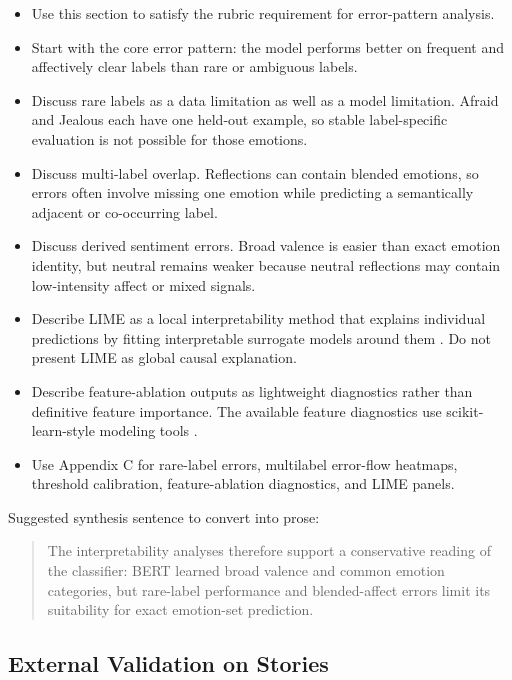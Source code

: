 \begin{itemize}
    \item Use this section to satisfy the rubric requirement for error-pattern analysis.
    \item Start with the core error pattern: the model performs better on frequent and affectively clear labels than rare or ambiguous labels.
    \item Discuss rare labels as a data limitation as well as a model limitation. Afraid and Jealous each have one held-out example, so stable label-specific evaluation is not possible for those emotions.
    \item Discuss multi-label overlap. Reflections can contain blended emotions, so errors often involve missing one emotion while predicting a semantically adjacent or co-occurring label.
    \item Discuss derived sentiment errors. Broad valence is easier than exact emotion identity, but neutral remains weaker because neutral reflections may contain low-intensity affect or mixed signals.
    \item Describe LIME as a local interpretability method that explains individual predictions by fitting interpretable surrogate models around them \parencite{ribeiro2016why}. Do not present LIME as global causal explanation.
    \item Describe feature-ablation outputs as lightweight diagnostics rather than definitive feature importance. The available feature diagnostics use scikit-learn-style modeling tools \parencite{pedregosa2011scikit}.
    \item Use Appendix C for rare-label errors, multilabel error-flow heatmaps, threshold calibration, feature-ablation diagnostics, and LIME panels.
\end{itemize}

Suggested synthesis sentence to convert into prose:
\begin{quote}
The interpretability analyses therefore support a conservative reading of the classifier: BERT learned broad valence and common emotion categories, but rare-label performance and blended-affect errors limit its suitability for exact emotion-set prediction.
\end{quote}

\subsection{External Validation on Stories}
\label{subs:external-validation-stories}

